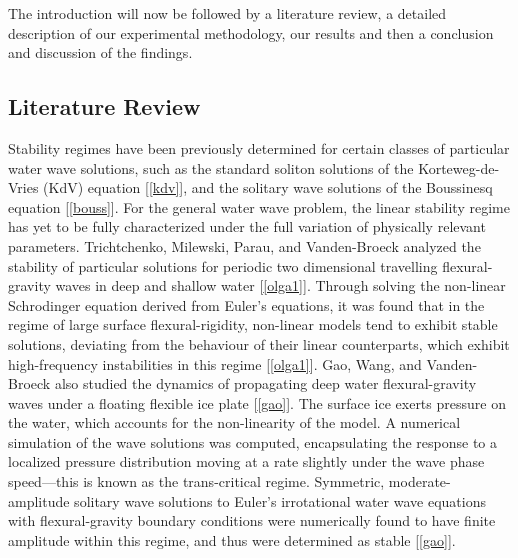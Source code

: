 \documentclass{article}
\begin{document}
The introduction will now be followed by a literature review, a detailed description of our experimental methodology, our results and then a conclusion and discussion of the findings. 

\subsection{Literature Review}

Stability regimes have been previously determined for certain classes of particular water wave solutions, such as the standard soliton solutions of the Korteweg-de-Vries (KdV) equation [\ref{kdv}], and the solitary wave solutions of the Boussinesq equation [\ref{bouss}]. For the general water wave problem, the linear stability regime has yet to be fully characterized under the full variation of physically relevant parameters. Trichtchenko, Milewski, Parau, and Vanden-Broeck analyzed the stability of particular solutions for periodic two dimensional travelling flexural-gravity waves in deep and shallow water [\ref{olga1}]. Through solving the non-linear Schrodinger equation derived from Euler’s equations, it was found that in the regime of large surface flexural-rigidity, non-linear models tend to exhibit stable solutions, deviating from the behaviour of their linear counterparts, which exhibit high-frequency instabilities in this regime [\ref{olga1}]. Gao, Wang, and Vanden-Broeck also studied the dynamics of propagating deep water flexural-gravity waves under a floating flexible ice plate [\ref{gao}]. The surface ice exerts pressure on the water, which accounts for the non-linearity of the model. A numerical simulation of the wave solutions was computed, encapsulating the response to a localized pressure distribution moving at a rate slightly under the wave phase speed—this is known as the trans-critical regime. Symmetric, moderate-amplitude solitary wave solutions to Euler’s irrotational water wave equations with flexural-gravity boundary conditions were numerically found to have finite amplitude within this regime, and thus were determined as stable [\ref{gao}].\\ 
\end{document}
